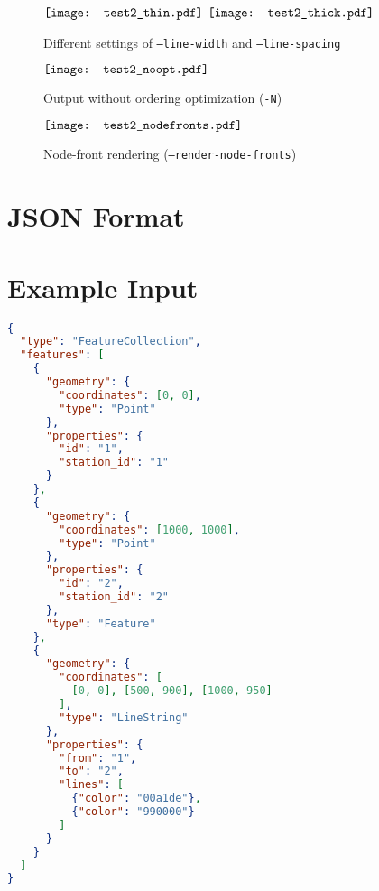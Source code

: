 \documentclass[10pt,a4paper]{article}
\begin{document}
\begin{figure}[htbp]
  \centering
	$	\vcenter{\hbox{\texttt{[image: test2\_thin.pdf]}}}$
	\hspace{5mm}
$	\vcenter{\hbox{\texttt{[image: test2\_thick.pdf]}}}$
	\caption{Different settings of \texttt{--line-width} and \texttt{--line-spacing}}
\end{figure}

\begin{figure}[htbp]
  \centering
$	\vcenter{\hbox{\texttt{[image: test2\_noopt.pdf]}}}$
	\caption{Output without ordering optimization (\texttt{-N})}
\end{figure}

\begin{figure}[htbp]
  \centering
$	\vcenter{\hbox{\texttt{[image: test2\_nodefronts.pdf]}}}$
	\caption{Node-front rendering (\texttt{--render-node-fronts})}
\end{figure}

\section{JSON Format}

\section{Example Input}


\begin{lstlisting}[language=json,firstnumber=1]
{
  "type": "FeatureCollection",
  "features": [
    {
      "geometry": {
        "coordinates": [0, 0],
        "type": "Point"
      },
      "properties": {
        "id": "1",
        "station_id": "1"
      }
    },
    {
      "geometry": {
        "coordinates": [1000, 1000],
        "type": "Point"
      },
      "properties": {
        "id": "2",
        "station_id": "2"
      },
      "type": "Feature"
    },
    {
      "geometry": {
        "coordinates": [
          [0, 0], [500, 900], [1000, 950]
        ],
        "type": "LineString"
      },
      "properties": {
        "from": "1",
        "to": "2",
        "lines": [
          {"color": "00a1de"},
          {"color": "990000"}
        ]
      }
    }
  ]
}
\end{lstlisting}
\end{document}
